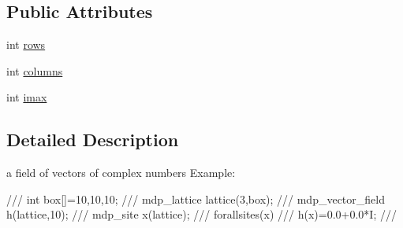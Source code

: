 \subsection*{Public Attributes}
\begin{DoxyCompactItemize}
\item 
int \hyperlink{classmdp__vector__field_ace0dc78c30bf473dab2014dac9b56d1d}{rows}
\item 
int \hyperlink{classmdp__vector__field_a79e671979619905202e5b725dabe41db}{columns}
\item 
int \hyperlink{classmdp__vector__field_a20e58b016cfd50221192aafc45029dfb}{imax}
\end{DoxyCompactItemize}


\subsection{Detailed Description}
a field of vectors of complex numbers Example: \begin{DoxyVerb}
///    int box[]={10,10,10};
///    mdp_lattice lattice(3,box);
///    mdp_vector_field h(lattice,10);
///    mdp_site x(lattice);
///    forallsites(x)
///      h(x)=0.0+0.0*I;
/// \end{DoxyVerb}
 


